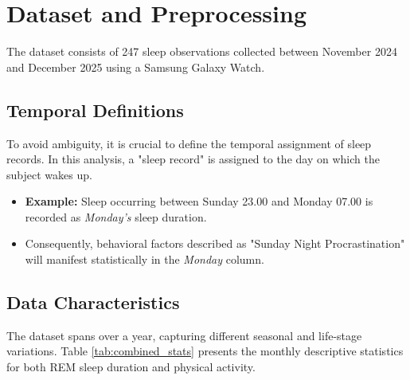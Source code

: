 \documentclass[conference]{IEEEtran}
\begin{document}
\section{Dataset and Preprocessing}
The dataset consists of 247 sleep observations collected between November 2024 and December 2025 using a Samsung Galaxy Watch.

\subsection{Temporal Definitions}
To avoid ambiguity, it is crucial to define the temporal assignment of sleep records. In this analysis, a "sleep record" is assigned to the day on which the subject wakes up.
\begin{itemize}
    \item \textbf{Example:} Sleep occurring between Sunday 23.00 and Monday 07.00 is recorded as \textit{Monday's} sleep duration.
    \item Consequently, behavioral factors described as "Sunday Night Procrastination" will manifest statistically in the \textit{Monday} column.
\end{itemize}

\subsection{Data Characteristics}
The dataset spans over a year, capturing different seasonal and life-stage variations. Table \ref{tab:combined_stats} presents the monthly descriptive statistics for both REM sleep duration and physical activity.
\end{document}

